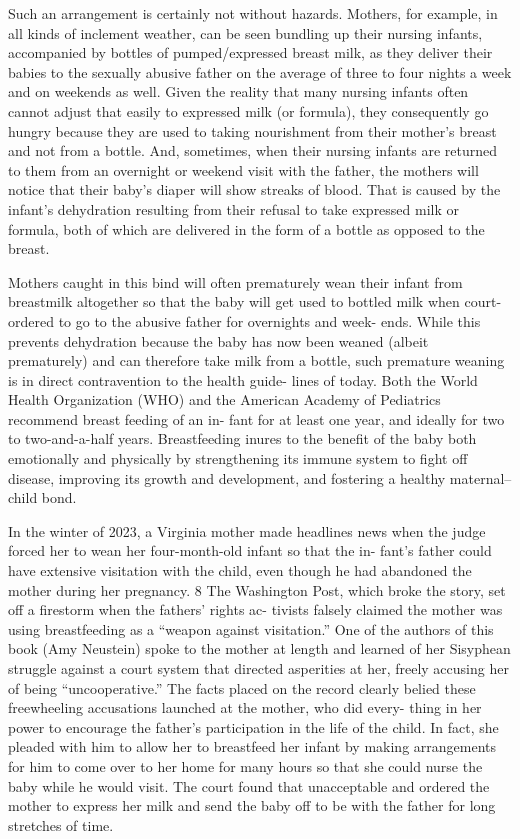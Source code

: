 Such an arrangement is certainly not without hazards. Mothers, for
example, in all kinds of inclement weather, can be seen bundling up their
nursing infants, accompanied by bottles of pumped/expressed breast
milk, as they deliver their babies to the sexually abusive father on the
average of three to four nights a week and on weekends as well. Given
the reality that many nursing infants often cannot adjust that easily to
expressed milk (or formula), they consequently go hungry because they
are used to taking nourishment from their mother’s breast and not from
a bottle. And, sometimes, when their nursing infants are returned to
them from an overnight or weekend visit with the father, the mothers
will notice that their baby’s diaper will show streaks of blood. That is
caused by the infant’s dehydration resulting from their refusal to take
expressed milk or formula, both of which are delivered in the form of a
bottle as opposed to the breast. \pfl{}


Mothers caught in this bind will often prematurely wean their infant
from breastmilk altogether so that the baby will get used to bottled milk
when court-ordered to go to the abusive father for overnights and week-
ends. While this prevents dehydration because the baby has now been
weaned (albeit prematurely) and can therefore take milk from a bottle,
such premature weaning is in direct contravention to the health guide-
lines of today. Both the World Health Organization (WHO) and the
American Academy of Pediatrics recommend breast feeding of an in-
fant for at least one year, and ideally for two to two-and-a-half years.
Breastfeeding inures to the benefit of the baby both emotionally and
physically by strengthening its immune system to fight off disease,
improving its growth and development, and fostering a healthy
maternal–child bond. \pfl{}


In the winter of 2023, a Virginia mother made headlines news when
the judge forced her to wean her four-month-old infant so that the in-
fant’s father could have extensive visitation with the child, even though
he had abandoned the mother during her pregnancy. 8 The Washington
Post, which broke the story, set off a firestorm when the fathers’ rights ac-
tivists falsely claimed the mother was using breastfeeding as a “weapon
against visitation.” One of the authors of this book (Amy Neustein)
spoke to the mother at length and learned of her Sisyphean struggle
against a court system that directed asperities at her, freely accusing her
of being “uncooperative.” The facts placed on the record clearly belied
these freewheeling accusations launched at the mother, who did every-
thing in her power to encourage the father’s participation in the life of
the child. In fact, she pleaded with him to allow her to breastfeed her
infant by making arrangements for him to come over to her home for
many hours so that she could nurse the baby while he would visit. The
court found that unacceptable and ordered the mother to express her
milk and send the baby off to be with the father for long stretches of
time. \pfl{}


